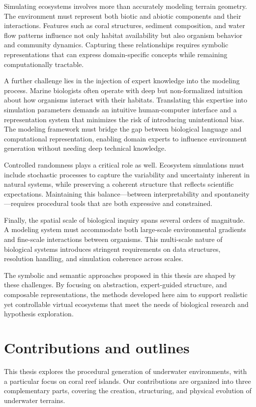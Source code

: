 Simulating ecosystems involves more than accurately modeling terrain geometry. The environment must represent both biotic and abiotic components and their interactions. Features such as coral structures, sediment composition, and water flow patterns influence not only habitat availability but also organism behavior and community dynamics. Capturing these relationships requires symbolic representations that can express domain-specific concepts while remaining computationally tractable.

A further challenge lies in the injection of expert knowledge into the modeling process. Marine biologists often operate with deep but non-formalized intuition about how organisms interact with their habitats. Translating this expertise into simulation parameters demands an intuitive human-computer interface and a representation system that minimizes the risk of introducing unintentional bias. The modeling framework must bridge the gap between biological language and computational representation, enabling domain experts to influence environment generation without needing deep technical knowledge.

Controlled randomness plays a critical role as well. Ecosystem simulations must include stochastic processes to capture the variability and uncertainty inherent in natural systems, while preserving a coherent structure that reflects scientific expectations. Maintaining this balance—between interpretability and spontaneity—requires procedural tools that are both expressive and constrained.

Finally, the spatial scale of biological inquiry spans several orders of magnitude. A modeling system must accommodate both large-scale environmental gradients and fine-scale interactions between organisms. This multi-scale nature of biological systems introduces stringent requirements on data structures, resolution handling, and simulation coherence across scales.

The symbolic and semantic approaches proposed in this thesis are shaped by these challenges. By focusing on abstraction, expert-guided structure, and composable representations, the methods developed here aim to support realistic yet controllable virtual ecosystems that meet the needs of biological research and hypothesis exploration.


\section{Contributions and outlines}
This thesis explores the procedural generation of underwater environments, with a particular focus on coral reef islands. Our contributions are organized into three complementary parts, covering the creation, structuring, and physical evolution of underwater terrains.

